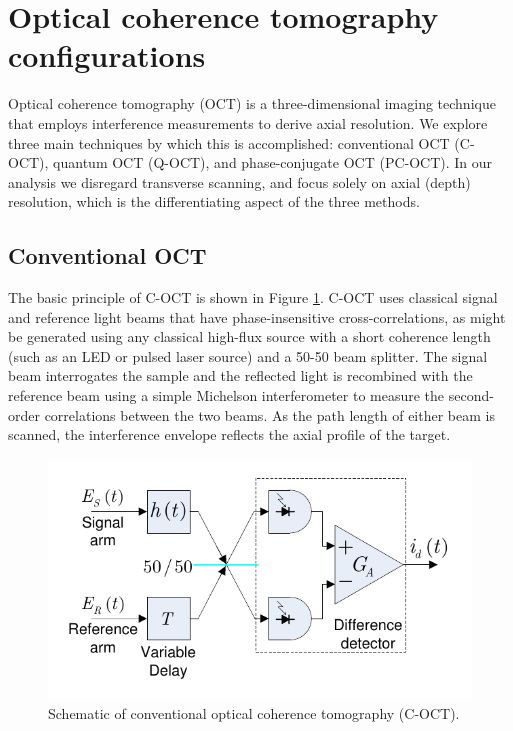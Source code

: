 \section{Optical coherence tomography configurations}

Optical coherence tomography (OCT) is a three-dimensional imaging technique that employs interference measurements to derive axial resolution. We explore three main techniques by which this is accomplished: conventional OCT (C-OCT), quantum OCT (Q-OCT), and phase-conjugate OCT (PC-OCT). In our analysis we disregard transverse scanning, and focus solely on axial (depth) resolution, which is the differentiating aspect of the three methods.

\subsection{Conventional OCT}

The basic principle of C-OCT is shown in Figure \ref{figure:pcoct-schematic-coct}. C-OCT uses classical signal and reference light beams that have phase-insensitive cross-correlations, as might be generated using any classical high-flux source with a short coherence length (such as an LED or pulsed laser source) and a 50-50 beam splitter. The signal beam interrogates the sample and the reflected light is recombined with the reference beam using a simple Michelson interferometer to measure the second-order correlations between the two beams. As the path length of either beam is scanned, the interference envelope reflects the axial profile of the target.

\begin{figure}[t]
\begin{center}
\includegraphics[width=13cm]{figure-pcoct-schematic-coct.pdf}
\caption{Schematic of conventional optical coherence tomography (C-OCT).}
\label{figure:pcoct-schematic-coct}
\end{center}
\end{figure}

